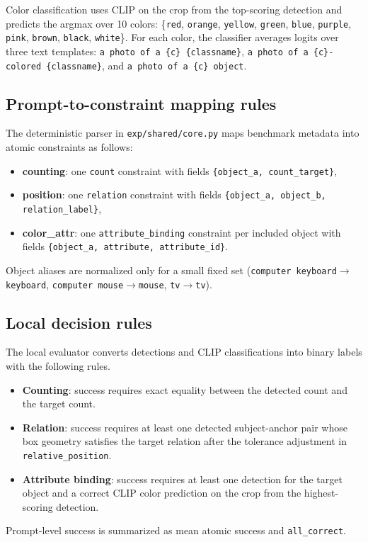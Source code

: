 \documentclass{article}
\begin{document}
Color classification uses CLIP on the crop from the top-scoring detection and predicts the argmax over 10 colors:
\{\texttt{red}, \texttt{orange}, \texttt{yellow}, \texttt{green}, \texttt{blue}, \texttt{purple}, \texttt{pink}, \texttt{brown}, \texttt{black}, \texttt{white}\}.
For each color, the classifier averages logits over three text templates:
\texttt{a photo of a \{c\} \{classname\}},
\texttt{a photo of a \{c\}-colored \{classname\}},
and \texttt{a photo of a \{c\} object}.

\subsection{Prompt-to-constraint mapping rules}
The deterministic parser in \texttt{exp/shared/core.py} maps benchmark metadata into atomic constraints as follows:
\begin{itemize}
  \item \textbf{counting}: one \texttt{count} constraint with fields \texttt{\{object\_a, count\_target\}},
  \item \textbf{position}: one \texttt{relation} constraint with fields \texttt{\{object\_a, object\_b, relation\_label\}},
  \item \textbf{color\_attr}: one \texttt{attribute\_binding} constraint per included object with fields \texttt{\{object\_a, attribute, attribute\_id\}}.
\end{itemize}
Object aliases are normalized only for a small fixed set (\texttt{computer keyboard}$\rightarrow$\texttt{keyboard}, \texttt{computer mouse}$\rightarrow$\texttt{mouse}, \texttt{tv}$\rightarrow$\texttt{tv}).

\subsection{Local decision rules}
The local evaluator converts detections and CLIP classifications into binary labels with the following rules.
\begin{itemize}
  \item \textbf{Counting}: success requires exact equality between the detected count and the target count.
  \item \textbf{Relation}: success requires at least one detected subject-anchor pair whose box geometry satisfies the target relation after the tolerance adjustment in \texttt{relative\_position}.
  \item \textbf{Attribute binding}: success requires at least one detection for the target object and a correct CLIP color prediction on the crop from the highest-scoring detection.
\end{itemize}
Prompt-level success is summarized as mean atomic success and \texttt{all\_correct}.
\end{document}
